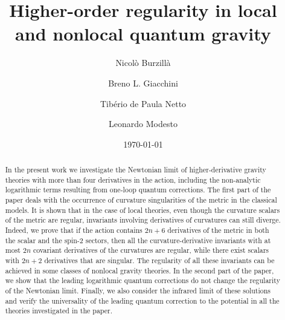 \documentclass[aps,prd,a4paper,twocolumn,showpacs,showkeys,preprintnumbers,amsmath,amssymb,nofootinbib]{revtex4-2}
\numberwithin{equation}{section}
\begin{document}
\title{Higher-order regularity in  local and nonlocal quantum gravity} 

\author{Nicol\`o Burzill\`a}

\author{Breno L. Giacchini}

\author{Tib\'{e}rio de Paula Netto}

\author{Leonardo Modesto}


\date{\small\today}

\begin{abstract} \noindent
In the present work we investigate the Newtonian limit of higher-derivative gravity theories with more than four derivatives in the action, including the non-analytic logarithmic terms resulting from one-loop quantum corrections. The first part of the paper deals with the occurrence of curvature singularities of the metric in the classical models.
It is shown that in the case of local theories, even though the curvature scalars of the metric are regular, invariants involving derivatives of curvatures can still diverge. 
Indeed, we prove that if the action contains $2n+6$ derivatives of the metric in both the scalar and the spin-2 sectors, then all the curvature-derivative invariants with at most $2n$ covariant derivatives of the curvatures are regular, while there exist scalars with $2n+2$ derivatives that are singular. The regularity of all these invariants can be achieved in some classes of nonlocal gravity theories.
In the second part of the paper, we show that the leading logarithmic quantum corrections do not change the regularity of the Newtonian limit.
Finally, we also consider the infrared limit of these solutions and verify the universality of the leading quantum correction to the potential in all the theories investigated in the paper.
\end{abstract}

\pacs{}
\keywords{}

\maketitle
\noindent


\end{document}
